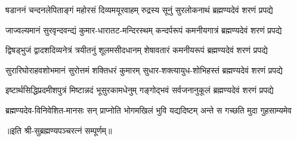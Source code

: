 
\fourlineindentedshloka
{षडाननं चन्दनलेपिताङ्गं}
{महोरसं दिव्यमयूरवाहम्}
{रुद्रस्य सूनुं सुरलोकनाथं}
{ब्रह्मण्यदेवं शरणं प्रपद्ये}

\fourlineindentedshloka
{जाज्वल्यमानं सुरवृन्दवन्द्यं}
{कुमार-धारातट-मन्दिरस्थम्}
{कन्दर्परूपं कमनीयगात्रं}
{ब्रह्मण्यदेवं शरणं प्रपद्ये}

\fourlineindentedshloka
{द्विषड्भुजं द्वादशदिव्यनेत्रं}
{त्रयीतनुं शूलमसीदधानम्}
{शेषावतारं कमनीयरूपं}
{ब्रह्मण्यदेवं शरणं प्रपद्ये}

\fourlineindentedshloka
{सुरारिघोराहवशोभमानं}
{सुरोत्तमं शक्तिधरं कुमारम्}
{सुधार-शक्त्यायुध-शोभिहस्तं}
{ब्रह्मण्यदेवं शरणं प्रपद्ये}

\fourlineindentedshloka
{इष्टार्थसिद्धिप्रदमीशपुत्रं}
{मिष्टान्नदं भूसुरकामधेनुम्}
{गङ्गोद्भवं सर्वजनानुकूलं}
{ब्रह्मण्यदेवं शरणं प्रपद्ये}

{ब्रह्मण्यदेव-विनिवेशित-मानसः सन्}
{प्राप्नोति भोगमखिलं भुवि यद्यदिष्टम्}
{अन्ते स गच्छति मुदा गुहसाम्यमेव}

॥इति श्री-सुब्रह्मण्यपञ्चरत्नं सम्पूर्णम्॥
